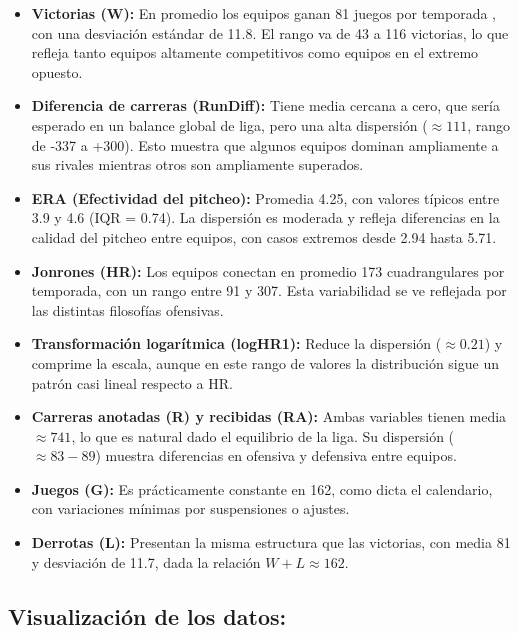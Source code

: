 \documentclass[10pt]{article}
\begin{document}
\begin{itemize}
    \item \textbf{Victorias (W):} En promedio los equipos ganan 81 juegos por temporada , con una desviación estándar de 11.8. El rango va de 43 a 116 victorias, lo que refleja tanto equipos altamente competitivos como equipos en el extremo opuesto.
    \item \textbf{Diferencia de carreras (RunDiff):} Tiene media cercana a cero, que sería esperado en un balance global de liga, pero una alta dispersión ($\approx 111$, rango de -337 a +300). Esto muestra que algunos equipos dominan ampliamente a sus rivales mientras otros son ampliamente superados.
    \item \textbf{ERA (Efectividad del pitcheo):} Promedia 4.25, con valores típicos entre 3.9 y 4.6 (IQR = 0.74). La dispersión es moderada y refleja diferencias en la calidad del pitcheo entre equipos, con casos extremos desde 2.94 hasta 5.71.
    \item \textbf{Jonrones (HR):} Los equipos conectan en promedio 173 cuadrangulares por temporada, con un rango entre 91 y 307. Esta variabilidad se ve reflejada por las distintas filosofías ofensivas.
    \item \textbf{Transformación logarítmica (logHR1):} Reduce la dispersión ($\approx 0.21$) y comprime la escala, aunque en este rango de valores la distribución sigue un patrón casi lineal respecto a HR.
    \item \textbf{Carreras anotadas (R) y recibidas (RA):} Ambas variables tienen media $\approx 741$, lo que es natural dado el equilibrio de la liga. Su dispersión ($\approx 83-89$) muestra diferencias en ofensiva y defensiva entre equipos.
    \item \textbf{Juegos (G):} Es prácticamente constante en 162, como dicta el calendario, con variaciones mínimas por suspensiones o ajustes.
    \item \textbf{Derrotas (L):} Presentan la misma estructura que las victorias, con media 81 y desviación de 11.7, dada la relación \(W+L \approx 162\).
\end{itemize}
\subsection{Visualización de los datos:}
\end{document}
